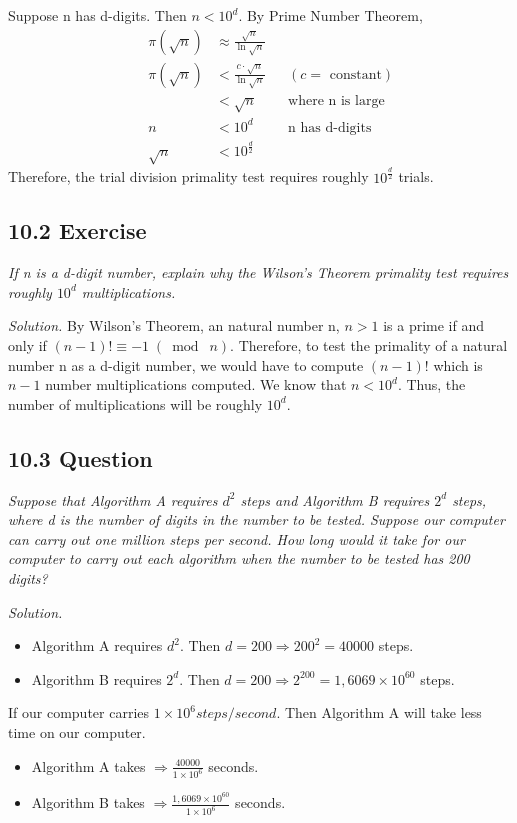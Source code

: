 \documentclass{article}
\begin{document}
Suppose n has d-digits. Then $n < 10^d$. By Prime Number Theorem,
\begin{align*}
    &&\pi(\sqrt{n}) &\approx \frac{\sqrt{n}}{\ln{\sqrt{n}}} &&\\
    &&\pi(\sqrt{n}) &< \frac{c \cdot \sqrt{n}}{\ln{\sqrt{n}}} && (c = \text{ constant})\\
    &&              &< \sqrt{n} && \text{where n is large}\\
    &&      n       &< 10^d && \text{n has d-digits}\\
    &&  \sqrt{n}    &< 10^{\frac{d}{2}} &&
\end{align*}
Therefore, the trial division primality test requires roughly $10^{\frac{d}{2}}$ trials. 

\subsection*{10.2 Exercise} 
\quad \textit{If n is a d-digit number, explain why the Wilson's Theorem primality test requires roughly $10^d$ multiplications.}

\textit{Solution.} By Wilson's Theorem, an natural number n, $n>1$ is a prime if and only if $(n-1)! \equiv -1 \;(\bmod\; n)$. Therefore, to test the primality of a natural number n as a d-digit number, we would have to compute $(n-1)!$ which is $n-1$ number multiplications computed. We know that $n < 10^d$. Thus, the number of multiplications will be roughly $10^d$.

\subsection*{10.3 Question} 
\quad \textit{Suppose that Algorithm A requires $d^2$ steps and Algorithm B requires $2^d$ steps, where d is the number of digits in the number to be tested. Suppose our computer can carry out one million steps per second. How long would it take for our computer to carry out each algorithm when the number to be tested has 200 digits?}

\textit{Solution.}
\begin{itemize}
    \item Algorithm A requires $d^2$. Then $d = 200 \Longrightarrow 200^2 = 40 000$ steps.
    \item Algorithm B requires $2^d$. Then $d = 200 \Longrightarrow 2^200 = 1,6069 \times 10^{60}$ steps.
\end{itemize}
If our computer carries $1 \times 10^6 steps/second$. Then Algorithm A will take less time on our computer.  
\begin{itemize}
    \item Algorithm A takes $\Longrightarrow \frac{40 000}{1 \times 10^6}$ seconds.
    \item Algorithm B takes $\Longrightarrow \frac{1,6069 \times 10^{60}}{1 \times 10^6}$ seconds.
\end{itemize}
\end{document}
